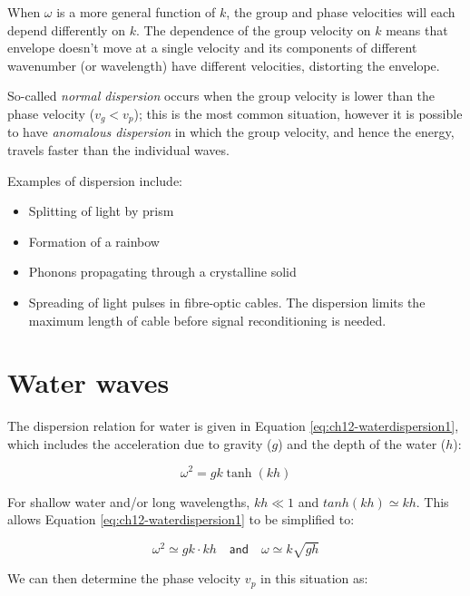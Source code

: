 \documentclass[
]{book}
\providecommand{\tightlist}{%
  \setlength{\itemsep}{0pt}\setlength{\parskip}{0pt}}
\begin{document}
When \(\omega\) is a more general function of \(k\), the group and phase velocities will each depend differently on \(k\). The dependence of the group velocity on \(k\) means that envelope doesn't move at a single velocity and its components of different wavenumber (or wavelength) have different velocities, distorting the envelope.

So-called \emph{normal dispersion} occurs when the group velocity is lower than the phase velocity (\(v_g < v_p\)); this is the most common situation, however it is possible to have \emph{anomalous dispersion} in which the group velocity, and hence the energy, travels faster than the individual waves.

Examples of dispersion include:

\begin{itemize}
\tightlist
\item
  Splitting of light by prism
\item
  Formation of a rainbow
\item
  Phonons propagating through a crystalline solid
\item
  Spreading of light pulses in fibre-optic cables. The dispersion limits the maximum length of cable before signal reconditioning is needed.
\end{itemize}

\hypertarget{sec-ch12-waterwaves}{%
\section{Water waves}\label{sec-ch12-waterwaves}}

The dispersion relation for water is given in Equation \eqref{eq:ch12-waterdispersion1}, which includes the acceleration due to gravity (\(g\)) and the depth of the water (\(h\)):

\begin{equation}
\omega^2 = gk\tanh(kh)
\label{eq:ch12-waterdispersion1}
\end{equation}

For shallow water and/or long wavelengths, \(kh \ll 1\) and \(tanh(kh) \simeq kh\). This allows Equation \eqref{eq:ch12-waterdispersion1} to be simplified to:

\begin{equation}
\omega^2 \simeq gk \cdot kh \quad \textsf{and} \quad \omega \simeq k \sqrt{gh}
\end{equation}

We can then determine the phase velocity \(v_p\) in this situation as:
\end{document}
